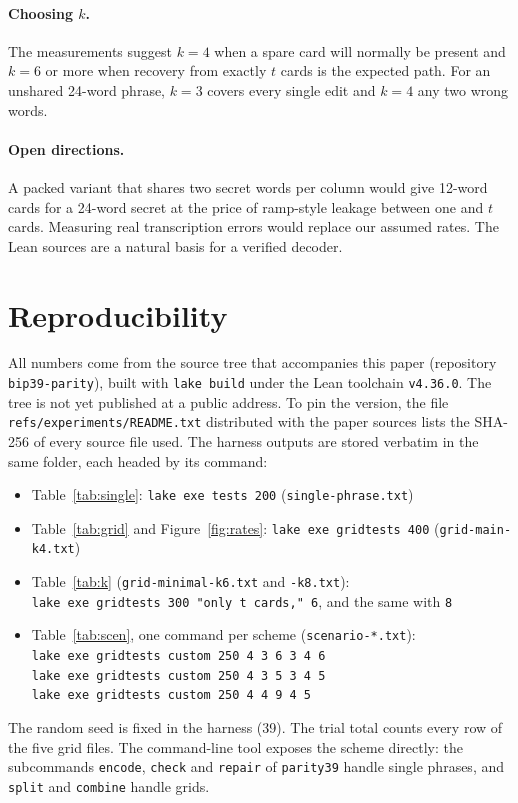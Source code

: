 \documentclass[numeric]{anvil-paper}
\newcommand{\code}[1]{\texttt{#1}}
\begin{document}
\paragraph{Choosing $k$.}
The measurements suggest $k=4$ when a spare card will normally be present and
$k=6$ or more when recovery from exactly $t$ cards is the expected path. For an
unshared 24-word phrase, $k=3$ covers every single edit and $k=4$ any two wrong
words.

\paragraph{Open directions.}
A packed variant that shares two secret words per column would give 12-word
cards for a 24-word secret at the price of ramp-style leakage between one and
$t$ cards. Measuring real transcription errors would replace our assumed rates.
The Lean sources are a natural basis for a verified decoder.

\section{Reproducibility}
\label{sec:repro}

All numbers come from the source tree that accompanies this paper (repository
\code{bip39-parity}), built with \code{lake build} under the Lean toolchain
\code{v4.36.0}. The tree is not yet published at a public address. To pin the
version, the file \code{refs/experiments/README.txt} distributed with the paper
sources lists the SHA-256 of every source file used. The harness outputs are
stored verbatim in the same folder, each headed by its command:
\begin{itemize}
\item Table~\ref{tab:single}: \code{lake exe tests 200}
  (\code{single-phrase.txt})
\item Table~\ref{tab:grid} and Figure~\ref{fig:rates}:
  \code{lake exe gridtests 400} (\code{grid-main-k4.txt})
\item Table~\ref{tab:k} (\code{grid-minimal-k6.txt} and \code{-k8.txt}):\\
  \code{lake exe gridtests 300 "only t cards," 6}, and the same with \code{8}
\item Table~\ref{tab:scen}, one command per scheme
  (\code{scenario-*.txt}):\\
  \code{lake exe gridtests custom 250 4 3 6 3 4 6}\\
  \code{lake exe gridtests custom 250 4 3 5 3 4 5}\\
  \code{lake exe gridtests custom 250 4 4 9 4 5}
\end{itemize}
The random seed is fixed in the harness (39). The trial total counts every row
of the five grid files. The command-line tool exposes the scheme directly: the
subcommands \code{encode}, \code{check} and \code{repair} of \code{parity39}
handle single phrases, and \code{split} and \code{combine} handle grids.
\end{document}
